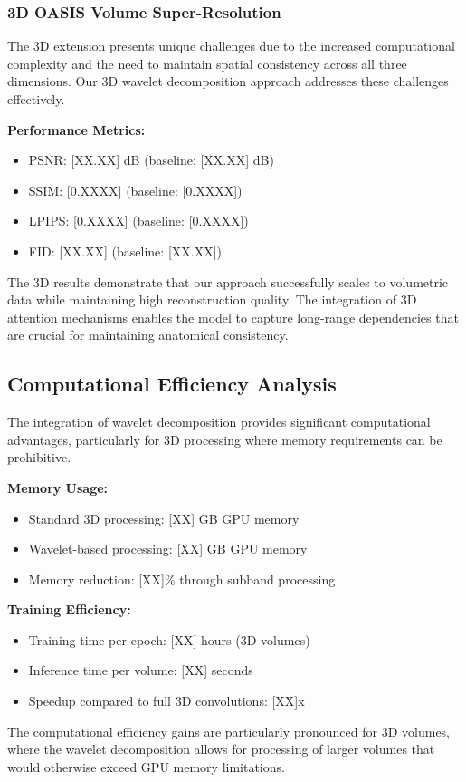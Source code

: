 \documentclass{midl} %
\begin{document}
\subsubsection{3D OASIS Volume Super-Resolution}

The 3D extension presents unique challenges due to the increased computational complexity and the need to maintain spatial consistency across all three dimensions. Our 3D wavelet decomposition approach addresses these challenges effectively.

\textbf{Performance Metrics:}
\begin{itemize}
\item PSNR: [XX.XX] dB (baseline: [XX.XX] dB)
\item SSIM: [0.XXXX] (baseline: [0.XXXX])
\item LPIPS: [0.XXXX] (baseline: [0.XXXX])
\item FID: [XX.XX] (baseline: [XX.XX])
\end{itemize}

The 3D results demonstrate that our approach successfully scales to volumetric data while maintaining high reconstruction quality. The integration of 3D attention mechanisms enables the model to capture long-range dependencies that are crucial for maintaining anatomical consistency.

\subsection{Computational Efficiency Analysis}

The integration of wavelet decomposition provides significant computational advantages, particularly for 3D processing where memory requirements can be prohibitive.

\textbf{Memory Usage:}
\begin{itemize}
\item Standard 3D processing: [XX] GB GPU memory
\item Wavelet-based processing: [XX] GB GPU memory
\item Memory reduction: [XX]\% through subband processing
\end{itemize}

\textbf{Training Efficiency:}
\begin{itemize}
\item Training time per epoch: [XX] hours (3D volumes)
\item Inference time per volume: [XX] seconds
\item Speedup compared to full 3D convolutions: [XX]x
\end{itemize}

The computational efficiency gains are particularly pronounced for 3D volumes, where the wavelet decomposition allows for processing of larger volumes that would otherwise exceed GPU memory limitations.



\end{document}

